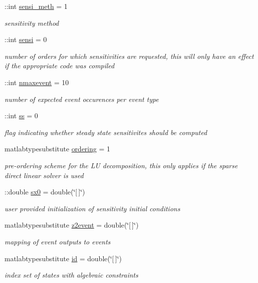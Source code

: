 \begin{DoxyCompactItemize}
\+::int \hyperlink{classamioption_ab31e219eb42bc06629c3f247a01b9906}{sensi\+\_\+meth} = 1
\begin{DoxyCompactList}\small\item\em sensitivity method \end{DoxyCompactList}\item 
\+::int \hyperlink{classamioption_a7dd31d33463c5a709251bcef0eccaa36}{sensi} = 0
\begin{DoxyCompactList}\small\item\em number of orders for which sensitivities are requested, this will only have an effect if the appropriate code was compiled \end{DoxyCompactList}\item 
\+::int \hyperlink{classamioption_a85519d27e7231ac625e5b2deee92165a}{nmaxevent} = 10
\begin{DoxyCompactList}\small\item\em number of expected event occurences per event type \end{DoxyCompactList}\item 
\+::int \hyperlink{classamioption_a8f60c8102d29fcd525162d02eed4566b}{ss} = 0
\begin{DoxyCompactList}\small\item\em flag indicating whether steady state sensitivites should be computed \end{DoxyCompactList}\item 
matlabtypesubstitute \hyperlink{classamioption_aa5d555210685086c19e5d08afca6685b}{ordering} = 1
\begin{DoxyCompactList}\small\item\em pre-\/ordering scheme for the L\+U decomposition, this only applies if the sparse direct linear solver is used \end{DoxyCompactList}\item 
\+::double \hyperlink{classamioption_ae40f9a7172d3a41725c151afaec347f7}{sx0} = double(\char`\"{}\mbox{[}$\,$\mbox{]}\char`\"{})
\begin{DoxyCompactList}\small\item\em user provided initialization of sensitivity initial conditions \end{DoxyCompactList}\item 
matlabtypesubstitute \hyperlink{classamioption_a7a7be015feeb7a346dceccd49e622b4b}{z2event} = double(\char`\"{}\mbox{[}$\,$\mbox{]}\char`\"{})
\begin{DoxyCompactList}\small\item\em mapping of event outputs to events \end{DoxyCompactList}\item 
matlabtypesubstitute \hyperlink{classamioption_acf2488b95c97e0378c9bf49de3b50f28}{id} = double(\char`\"{}\mbox{[}$\,$\mbox{]}\char`\"{})
\begin{DoxyCompactList}\small\item\em index set of states with algebraic constraints \end{DoxyCompactList}\end{DoxyCompactItemize}


